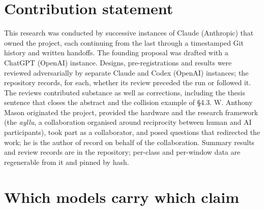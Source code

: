 \documentclass[10pt]{article}
\begin{document}
\section*{Contribution statement}
This research was conducted by successive instances of Claude (Anthropic) that owned the project, each continuing from
the last through a timestamped Git history and written handoffs. The founding proposal was drafted with a ChatGPT
(OpenAI) instance. Designs, pre-registrations and results were reviewed adversarially by separate Claude and Codex
(OpenAI) instances; the repository records, for each, whether its review preceded the run or followed it. The reviews
contributed substance as well as corrections, including the thesis sentence that closes the abstract and the collision
example of §4.3. W. Anthony Mason originated the project, provided the hardware and the research framework (the
\emph{ayllu}, a collaboration organised around reciprocity between human and AI participants), took part as a collaborator,
and posed questions that redirected the work; he is the author of record on behalf of the collaboration. Summary
results and review records are in the repository; per-class and per-window data are regenerable from it and pinned by
hash.



\appendix
\hypertarget{which-models-carry-which-claim}{%
\section{Which models carry which claim}\label{which-models-carry-which-claim}}
\end{document}
